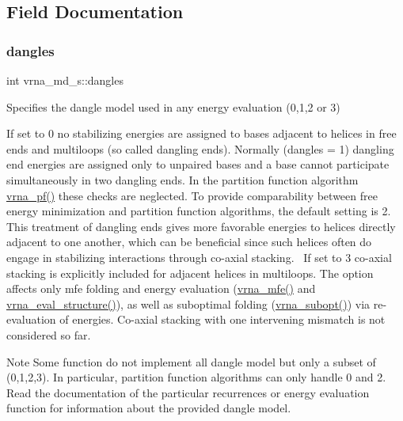 \subsection{Field Documentation}
\mbox{\label{structvrna__md__s_adcda4ff2ea77748ae0e8700288282efc}} 
\subsubsection{\texorpdfstring{dangles}{dangles}}
{\footnotesize\ttfamily int vrna\+\_\+md\+\_\+s\+::dangles}



Specifies the dangle model used in any energy evaluation (0,1,2 or 3) 

If set to 0 no stabilizing energies are assigned to bases adjacent to helices in free ends and multiloops (so called dangling ends). Normally (dangles = 1) dangling end energies are assigned only to unpaired bases and a base cannot participate simultaneously in two dangling ends. In the partition function algorithm \mbox{\hyperlink{group__pf__fold_ga29e256d688ad221b78d37f427e0e99bc}{vrna\+\_\+pf()}} these checks are neglected. To provide comparability between free energy minimization and partition function algorithms, the default setting is 2. This treatment of dangling ends gives more favorable energies to helices directly adjacent to one another, which can be beneficial since such helices often do engage in stabilizing interactions through co-\/axial stacking.~\newline
If set to 3 co-\/axial stacking is explicitly included for adjacent helices in multiloops. The option affects only mfe folding and energy evaluation (\mbox{\hyperlink{group__mfe__fold_gabd3b147371ccf25c577f88bbbaf159fd}{vrna\+\_\+mfe()}} and \mbox{\hyperlink{group__eval_ga58f199f1438d794a265f3b27fc8ea631}{vrna\+\_\+eval\+\_\+structure()}}), as well as suboptimal folding (\mbox{\hyperlink{group__subopt__wuchty_ga0f11d738fb8c8b1885a90c11c8931ff6}{vrna\+\_\+subopt()}}) via re-\/evaluation of energies. Co-\/axial stacking with one intervening mismatch is not considered so far. \begin{DoxyNote}{Note}
Some function do not implement all dangle model but only a subset of (0,1,2,3). In particular, partition function algorithms can only handle 0 and 2. Read the documentation of the particular recurrences or energy evaluation function for information about the provided dangle model. 
\end{DoxyNote}
\mbox{\label{structvrna__md__s_a9ed7ba42fcc46915c5c0c524f3d255f5}} 
